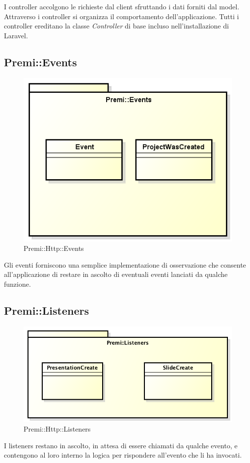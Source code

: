 I controller accolgono le richieste dal client sfruttando i dati forniti dal model. Attraverso i controller si organizza il comportamento dell'applicazione. Tutti i controller ereditano la classe \textit{Controller} di base incluso nell'installazione di \gls{Laravel}.


\newpage
\subsection{Premi::Events}
\begin{figure}[h]
	\centering
	\includegraphics[width=0.7\linewidth]{img/premi_back_end_events}
	\caption[Premi::Events]{Premi::Http::Events}
	\label{fig:premi_back_end_events}
\end{figure}

Gli eventi forniscono una semplice implementazione di osservazione che consente all'applicazione di restare in ascolto di eventuali eventi lanciati da qualche funzione.


\newpage
\subsection{Premi::Listeners}
\begin{figure}[h]
	\centering
	\includegraphics[width=0.7\linewidth]{img/back_end_premi_listeners}
	\caption[Premi::Http::Listeners]{Premi::Http::Listeners}
	\label{fig:back_end_premi_listeners}
\end{figure}

I listeners restano in ascolto, in attesa di essere chiamati da qualche evento, e contengono al loro interno la logica per rispondere  all'evento che li ha invocati. 

